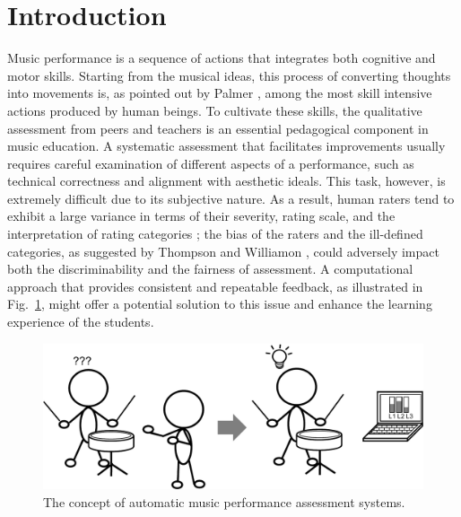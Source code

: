 \documentclass[conference]{IEEEtran}
\begin{document}

%
\IEEEpeerreviewmaketitle



\section{Introduction}
Music performance is a sequence of actions that integrates both cognitive and motor skills. Starting from the musical ideas, this process of converting thoughts into movements is, as pointed out by Palmer \cite{Palmer1997}, among the most skill intensive actions produced by human beings. To cultivate these skills, the qualitative assessment from  peers and teachers is an essential pedagogical component in music education. A systematic assessment that facilitates improvements usually requires careful examination of different aspects of a performance, such as technical correctness and alignment with aesthetic ideals. This task, however, is extremely difficult due to its subjective nature. As a result, human raters tend to exhibit a large variance in terms of their severity, rating scale, and the interpretation of rating categories \cite{Wesolowski2016}; the bias of the raters and the ill-defined categories, as suggested by Thompson and Williamon \cite{Thompson2003}, could adversely impact both the discriminability and the fairness of assessment. A computational approach that provides consistent and repeatable feedback, as illustrated in Fig.~\ref{fig:basic_idea}, might offer a potential solution to this issue and enhance the learning experience of the students. 

\begin{figure}
\centering
\includegraphics[width = 8 cm]{./figs/basic_idea.pdf}
\caption{The concept of automatic music performance assessment systems.}
\label{fig:basic_idea}
\end{figure}
\end{document}
